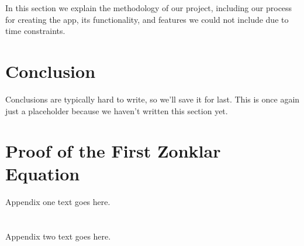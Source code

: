 \documentclass[a4paper, 10pt, american]{article}
\begin{document}
In this section we explain the methodology of our project,
including our process for creating the app, its functionality, and features we
could not include due to time constraints.

\lipsum


\section{Conclusion}
\label{sec:conclusion}

Conclusions are typically hard to write, so we'll save it for
last. This is once again just a placeholder because we haven't written this
section yet.

\lipsum[1]

\clearpage %




\appendices
\section{Proof of the First Zonklar Equation}
Appendix one text goes here.

\section{}
Appendix two text goes here.
\end{document}
